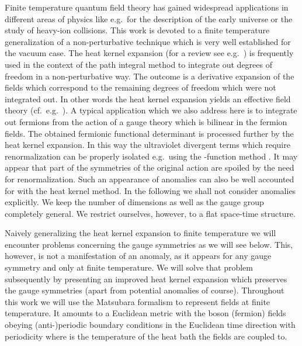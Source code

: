 \documentclass[a4paper,showpacs,showkeys,prd,nofootinbib]{revtex4}
\begin{document}
Finite temperature quantum field theory has gained widespread applications in different
areas of physics
like e.g.~for the description of the early universe or the study of heavy-ion collisions.
This work is devoted to a finite temperature generalization of a non-perturbative
technique which is very well established for the vacuum case. 
The heat kernel expansion \cite{Schwinger:1951nm,dewitt,Seeley:1967ea}
(for a review see e.g.~\cite{Ball:1989xg})
is frequently used in the context of the path integral
method to integrate out degrees of freedom in a non-perturbative way. The outcome
is a derivative expansion of the fields which correspond to the remaining degrees of 
freedom which were not integrated out. In other words the heat kernel expansion
yields an effective field theory (cf.~e.g.~\cite{Ball:1989xg,espraf,gasleut1}). 
A typical application
which we also address here is to integrate out fermions from the action of a gauge
theory which is bilinear in the fermion fields. The obtained fermionic functional 
determinant is processed further by the heat kernel expansion. In this way the 
ultraviolet divergent terms which require renormalization can be properly isolated
e.g.~using the \myHighlight{$\zeta$}\coordHE{}-function method \cite{Ball:1989xg}. It may appear that part of 
the symmetries of the original action are spoiled by the need for renormalization.
Such an appearance of anomalies can also be well accounted for with the heat kernel
method. In the following we shall not consider anomalies explicitly. We keep
the number of dimensions as well as the gauge group completely general. We restrict
ourselves, however, to a flat space-time structure.

Naively generalizing
the heat kernel expansion to finite temperature we will encounter problems concerning
the gauge symmetries as we will see below. 
This, however, is not a manifestation of an anomaly, as it
appears for any gauge symmetry and only at finite temperature. We will solve that
problem subsequently by presenting an improved heat kernel expansion which preserves
the gauge symmetries (apart from potential anomalies of course). Throughout this
work we will use the Matsubara formalism \cite{Matsubara:1955ws,Das:1997gg} 
to represent fields at 
finite temperature. It amounts to a Euclidean metric with the boson (fermion) fields
obeying (anti-)periodic boundary conditions in the Euclidean time direction with
periodicity \coordHE{} where \coordHE{} is the temperature of the heat bath the fields are
coupled to. 
\end{document}
